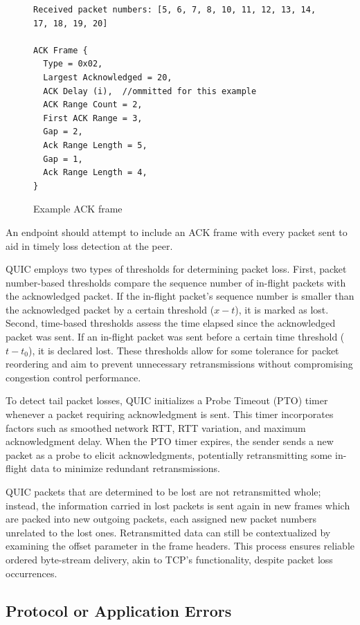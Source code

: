 \begin{figure}[htb]
    \centering
\begin{verbatim}
Received packet numbers: [5, 6, 7, 8, 10, 11, 12, 13, 14, 17, 18, 19, 20]

ACK Frame {
  Type = 0x02,
  Largest Acknowledged = 20,
  ACK Delay (i),  //ommitted for this example
  ACK Range Count = 2,
  First ACK Range = 3,        
  Gap = 2,
  Ack Range Length = 5,
  Gap = 1,
  Ack Range Length = 4,
}
\end{verbatim}
    \caption{Example ACK frame}
    \label{ack_frame_example}
\end{figure}

An endpoint should attempt to include an ACK frame with every packet sent to aid in timely loss detection at the peer. 

QUIC employs two types of thresholds for determining packet loss. First, packet number-based thresholds compare the sequence number of in-flight packets with the acknowledged packet. If the in-flight packet's sequence number is smaller than the acknowledged packet by a certain threshold ($x - t$), it is marked as lost. Second, time-based thresholds assess the time elapsed since the acknowledged packet was sent. If an in-flight packet was sent before a certain time threshold ($t - t_{0}$), it is declared lost. These thresholds allow for some tolerance for packet reordering and aim to prevent unnecessary retransmissions without compromising congestion control performance.

To detect tail packet losses, QUIC initializes a Probe Timeout (PTO) timer whenever a packet requiring acknowledgment is sent. This timer incorporates factors such as smoothed network RTT, RTT variation, and maximum acknowledgment delay. When the PTO timer expires, the sender sends a new packet as a probe to elicit acknowledgments, potentially retransmitting some in-flight data to minimize redundant retransmissions.

QUIC packets that are determined to be lost are not retransmitted whole; instead, the information carried in lost packets is sent again in new frames which are packed into new outgoing packets, each assigned new packet numbers unrelated to the lost ones. Retransmitted data can still be contextualized by examining the offset parameter in the frame headers. This process ensures reliable ordered byte-stream delivery, akin to TCP's functionality, despite packet loss occurrences.

\subsection{Protocol or Application Errors}

